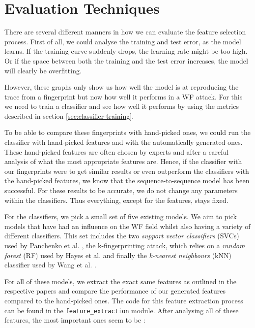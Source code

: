 
\section{Evaluation Techniques}

There are several different manners in how we can evaluate the feature selection process.
First of all, we could analyse the training and test error, as the model learns.
If the training curve suddenly drops, the learning rate might be too high.
Or if the space between both the training and the test error increases, the model will clearly be overfitting.

However, these graphs only show us how well the model is at reproducing the trace from a fingerprint but now how well it performs in a WF attack.
For this we need to train a classifier and see how well it performs by using the metrics described in section \ref{sec:classifier-training}.

To be able to compare these fingerprints with hand-picked ones, we could run the classifier with hand-picked features and with the automatically generated ones.
These hand-picked features are often chosen by experts and after a careful analysis of what the most appropriate features are.
Hence, if the classifier with our fingerprints were to get similar results or even outperform the classifiers with the hand-picked features, we know that the sequence-to-sequence model has been successful.
For these results to be accurate, we do not change any parameters within the classifiers.
Thus everything, except for the features, stays fixed.

For the classifiers, we pick a small set of five existing models.
We aim to pick models that have had an influence on the WF field whilst also having a variety of different classifiers.
This set includes the two \textit{support vector classifiers} (SVCs) used by Panchenko et al. \cite{panchenko1,panchenko2},
the k-fingerprinting attack, which relies on a \textit{random forest} (RF) used by Hayes et al. \cite{kfingerprinting}
and finally the \textit{k-nearest neighbours} (kNN) classifier used by Wang et al. \cite{wang_cai_johnson_nithyanand_goldberg_2014}.

For all of these models, we extract the exact same features as outlined in the respective papers and compare the performance of our generated features compared to the hand-picked ones.
The code for this feature extraction process can be found in the \texttt{feature\_extraction} module.
After analysing all of these features, the most important ones seem to be \cite{panchenko1,panchenko2,kfingerprinting,wang_cai_johnson_nithyanand_goldberg_2014}:

